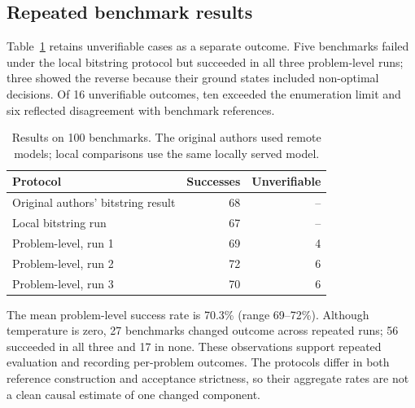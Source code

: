 \subsection{Repeated benchmark results}
Table~\ref{tab:verification} retains unverifiable cases as a separate outcome. Five benchmarks failed under the
local bitstring protocol but succeeded in all three problem-level runs; three showed the reverse because their
ground states included non-optimal decisions. Of 16 unverifiable outcomes, ten exceeded the enumeration limit
and six reflected disagreement with benchmark references.

\begin{table}[t]
\centering\small
\caption{Results on 100 benchmarks. The original authors used remote models; local comparisons use the same locally served model.}
\label{tab:verification}
\begin{tabular}{@{}lrr@{}}\toprule
Protocol & Successes & Unverifiable \\
\midrule
Original authors' bitstring result & 68 & -- \\
Local bitstring run & 67 & -- \\
Problem-level, run 1 & 69 & 4 \\
Problem-level, run 2 & 72 & 6 \\
Problem-level, run 3 & 70 & 6 \\
\bottomrule\end{tabular}
\end{table}

The mean problem-level success rate is 70.3\% (range 69--72\%). Although temperature is zero, 27 benchmarks
changed outcome across repeated runs; 56 succeeded in all three and 17 in none. These observations support
repeated evaluation and recording per-problem outcomes. The protocols differ in both reference construction
and acceptance strictness, so their aggregate rates are not a clean causal estimate of one changed component.
